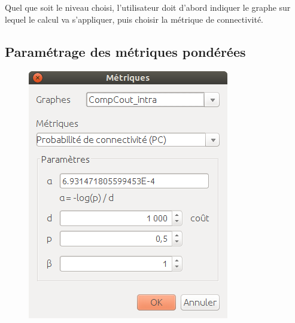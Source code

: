\documentclass{article}
\begin{document}
Quel que soit le niveau choisi, l’utilisateur doit d’abord indiquer le graphe sur lequel le calcul va s’appliquer, puis choisir la métrique de connectivité.

\subsection{Paramétrage des métriques pondérées}
\label{param_weight}

\begin{figure}[H]
	\includegraphics[scale=0.5]{img/manual-fr_metric_param.png} 
\end{figure}
\end{document}
